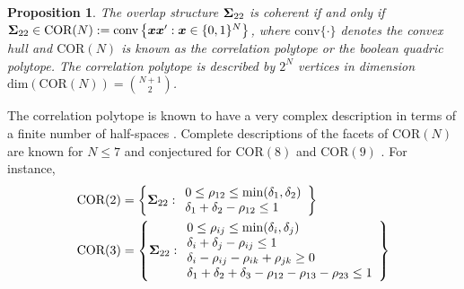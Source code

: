 \documentclass[12pt]{article}
\newcommand{\COR}{\text{COR}}
\newtheorem{proposition}[theorem]{Proposition}
\theoremstyle{definition}
\theoremstyle{definition}
\def\conv{\text{conv}}
\begin{document}
\begin{proposition}
\label{CorrelationPolytope}
The overlap structure ${\bf\Sigma}_{22}$ is coherent if and only
if 
${\bf\Sigma}_{22} \in \COR(N) := \conv\left\{
\boldsymbol{x}\boldsymbol{x}' : \boldsymbol{x} \in
\{0,1\}^N\right\}$,
where $\conv\{\cdot\}$ denotes the convex hull and $\COR(N)$ is known as the correlation
polytope or the boolean quadric polytope. The correlation polytope is described by $2^N$
vertices in dimension $\text{dim}(\COR(N)) = \binom{N+1}{2}$.
\end{proposition}
The correlation polytope is known to have a very complex description in terms of a finite
number of half-spaces \citep{padberg1989boolean, ziegler2000lectures}. Complete descriptions of the facets of $\COR(N)$ are known for $N \leq 7$ and conjectured for  $\COR(8)$ and $\COR(9)$ \citep{ziegler2000lectures, christofsmapo, pitowsky1991correlation}. For instance, 
\begin{align*}
\COR(2) &= 
\left\{ {\bf\Sigma}_{22} : 
\begin{array}{ll}
 0 \leq \rho_{12} \leq \min(\delta_1, \delta_2)\\
 \delta_1 + \delta_2 - \rho_{12} \leq 1
\end{array}
\right\}\\
\COR(3) &= 
\left\{ {\bf\Sigma}_{22} : 
\begin{array}{ll}
 0 \leq \rho_{ij} \leq \min(\delta_i, \delta_j)\\
 \delta_i + \delta_j - \rho_{ij} \leq 1\\
 \delta_i - \rho_{ij} - \rho_{ik} + \rho_{jk} \geq 0\\
 \delta_1 + \delta_2 + \delta_3 - \rho_{12} - \rho_{13} - \rho_{23} \leq 1
\end{array}
\right\}
\end{align*}
\end{document}
